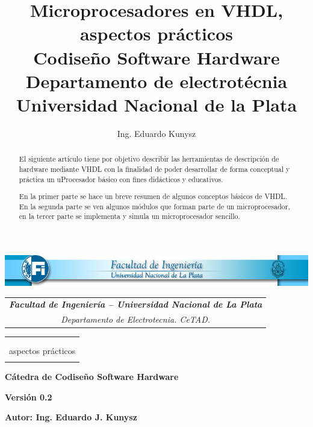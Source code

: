 \documentclass[a4paper,11pt]{article}
\title{\vspace{6cm} Microprocesadores en VHDL, aspectos prácticos \\ 
\large Codiseño Software Hardware \\ 
\large Departamento de electrotécnia \\
\large Universidad Nacional de la Plata
}
\author{ Ing. Eduardo Kunysz}
\begin{document}
\thispagestyle{empty} %

\begin{center}
\includegraphics[width=1\textwidth]{graficos/encabezado.jpg} 
\hspace{-1cm}
\begin{tabular}{c} 
 {\it \bf Facultad de Ingeniería -- Universidad Nacional de La Plata} \\ 
\vspace{0.2cm} {\it  Departamento de Electrotecnia. CeTAD.} 
\end{tabular}
\end{center}
\begin{table}[h]
\hspace{1.3cm}
\begin{tabular}{p{12cm}}
\hline \\[1cm]
\vspace{5cm}
\begin{center}
\LARGE \textbf{Microprocesadores en VHDL,\\
aspectos prácticos}
\\[2cm] 
\end{center}

\end{tabular}

\end{table}
\begin{center}
\large \textbf{Cátedra de Codiseño Software Hardware}
\end{center}
\begin{center}
 \large \textbf{Versión 0.2}            
\end{center}


\vspace{8cm}
\begin{flushright}
\large \textbf{Autor: Ing. Eduardo J. Kunysz}
\end{flushright}
\newpage
\thispagestyle{empty}
\begin{abstract}
El siguiente artículo tiene por objetivo describir las herramientas de descripción de hardware mediante VHDL con la finalidad de poder
desarrollar de forma conceptual y práctica un uProcesador básico con fines didácticos y educativos. 

En la primer parte se hace un breve resumen de algunos conceptos básicos de VHDL. En la segunda parte se ven algunos módulos
que forman parte de un microprocesador, en la tercer parte se implementa y simula un microprocesador sencillo.
\end{abstract}
\normalsize
\newpage
\setcounter{page}{1}
\tableofcontents
\end{document}
